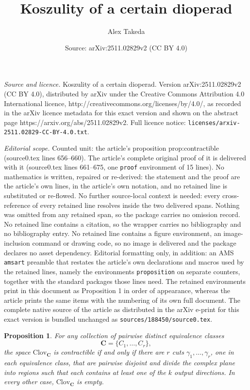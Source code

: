\documentclass[10pt,a4paper]{amsart}
\title{Koszulity of a certain dioperad}
\author{Alex Takeda}
\date{Source: arXiv:2511.02829v2 (CC BY 4.0)}
\newtheorem{proposition}{Proposition}
\begin{document}
\maketitle

\noindent\emph{Source and licence.} Koszulity of a certain dioperad. Version arXiv:2511.02829v2 (CC BY 4.0), distributed by arXiv under the Creative Commons Attribution 4.0 International licence, http://creativecommons.org/licenses/by/4.0/, as recorded in the arXiv licence metadata for this exact version and shown on the abstract page https://arxiv.org/abs/2511.02829v2. Full licence notice: \texttt{licenses/arxiv-2511.02829-CC-BY-4.0.txt}.\par\smallskip

\noindent\textit{Editorial scope.} Counted unit: the article's proposition prop:contractible (source0.tex lines 656--660). The article's complete original proof of it is delivered with it (source0.tex lines 661--675, one \texttt{proof} environment of 15 lines). No mathematics is written, repaired or re-derived: the statement and the proof are the article's own lines, in the article's own notation, and no retained line is substituted or re-flowed.  No further source-local context is needed: every cross-reference of every retained line resolves inside the two delivered spans.  Nothing was omitted from any retained span, so the package carries no omission record.  No retained line contains a citation, so the wrapper carries no bibliography and no bibliography entry.  No retained line contains a figure environment, an image-inclusion command or drawing code, so no image is delivered and the package declares no asset dependency.  Editorial formatting only, in addition: an AMS \texttt{amsart} preamble that restates the article's own declarations and macros used by the retained lines, namely the environments \texttt{proposition} on separate counters, together with the standard packages those lines need.  The retained environments print in this document as Proposition 1 in order of appearance, whereas the article prints the same items with the numbering of its own full document.  The complete native source of the article as distributed in the arXiv e-print for this exact version is bundled unchanged as \texttt{sources/188450/source0.tex}.
\begin{proposition}\label{prop:contractible}
    For any collection of pairwise distinct equivalence classes 
    \[ \mathbf{C} = \{C_1,\dots,C_r\}, \] 
    the space $\mathrm{Clov}_\mathbf{C}$ is contractible if and only if there are $r$ cuts $\gamma_1,\dots,\gamma_r$, one in each equivalence class, that are pairwise disjoint and divide the complex plane into regions such that each contains at least one of the $k$ output directions. In every other case, $\mathrm{Clov}_\mathbf{C}$ is empty.
\end{proposition}
\end{document}
